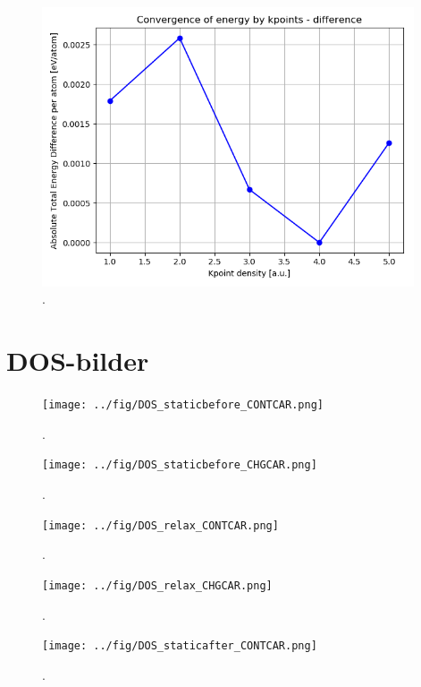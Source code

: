 \documentclass{article}
\begin{document}
  \begin{figure}[H]
      \centering
      \includegraphics[width = 11cm]{../fig/convergence_kpoints_difference.png}
      \caption{. }
      \label{fig:convergence_kpoints_difference.png}
  \end{figure}

\vspace{1cm}

\section{DOS-bilder}

  \iffalse
  \begin{figure}[H]
      \centering
      \texttt{[image: ../fig/DOS\_staticbefore\_CONTCAR.png]}
      \caption{. }
      \label{fig:DOS_staticbefore_CONTCAR}
  \end{figure}

  \begin{figure}[H]
      \centering
      \texttt{[image: ../fig/DOS\_staticbefore\_CHGCAR.png]}
      \caption{. }
      \label{fig:DOS_staticbefore_CHGCAR}
  \end{figure}

  \begin{figure}[H]
      \centering
      \texttt{[image: ../fig/DOS\_relax\_CONTCAR.png]}
      \caption{. }
      \label{fig:DOS_relax_CONTCAR}
  \end{figure}

  \begin{figure}[H]
      \centering
      \texttt{[image: ../fig/DOS\_relax\_CHGCAR.png]}
      \caption{. }
      \label{fig:DOS_relax_CHGCAR}
  \end{figure}

  \begin{figure}[H]
      \centering
      \texttt{[image: ../fig/DOS\_staticafter\_CONTCAR.png]}
      \caption{. }
      \label{fig:DOS_staticafter_CONTCAR}
  \end{figure}
\end{document}

